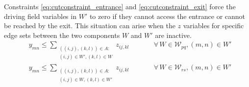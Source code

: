 \documentclass[10pt]{article}
\newcommand{\drivevar}[2]{y_{#1#2}}
\newcommand{\countvar}[4]{z_{#1#2,#3#4}}
\newcommand{\gridarcset}{A}
\newcommand{\entrancex}{p}
\newcommand{\entrancey}{q}
\newcommand{\exitx}{r}
\newcommand{\exity}{s}
\newcommand{\onewaypartitionsets}[1]{\mathcal{W}_{#1}}
\newcommand{\onewaypartition}{W}
\newcommand{\onewaypartitioncomp}{W'}
\theoremstyle{definition}
\begin{document}
Constraints \eqref{eq:cutconstraint_entrance} and \eqref{eq:cutconstraint_exit} force the driving field variables in $\onewaypartitioncomp$ to zero if they cannot access the entrance or cannot be reached by the exit. This situation can arise when the $z$ variables for specific edge sets between the two components $\onewaypartition$ and $\onewaypartitioncomp$ are inactive. 
\begin{align}
    & \drivevar{m}{n} \leq \sum_{\substack{((i,j),(k,l)) \in \gridarcset: \\ (i,j) \in \onewaypartitioncomp, (k, l) \in \onewaypartition}} \countvar{i}{j}{k}{l} \qquad && \forall \,  \onewaypartition \in \onewaypartitionsets{\entrancex \entrancey}, (m, n) \in \onewaypartitioncomp \label{eq:cutconstraint_entrance}\\
    & \drivevar{m}{n} \leq  \sum_{\substack{((i,j),(k,l)) \in \gridarcset: \\(i,j) \in \onewaypartition, (k, l) \in \onewaypartitioncomp}} \countvar{i}{j}{k}{l} \qquad && \forall \, \onewaypartition \in \onewaypartitionsets{\exitx \exity}, (m, n) \in \onewaypartitioncomp \label{eq:cutconstraint_exit}
\end{align}
\end{document}
